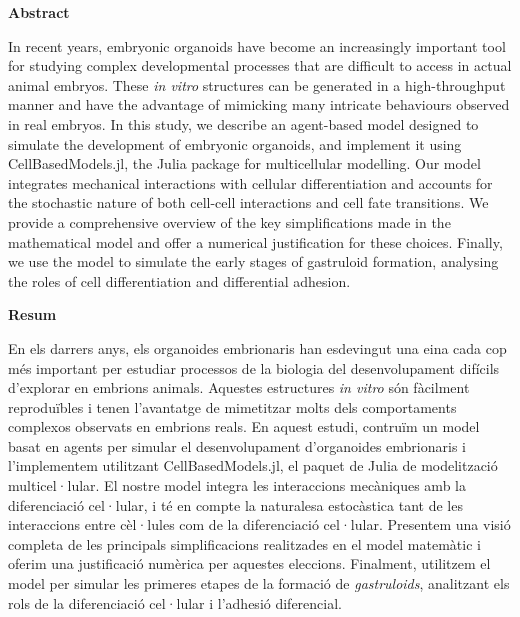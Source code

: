 \thispagestyle{plain}                                   %

\begin{center}
    {\Large\bfseries\sffamily  Abstract}
\end{center}

\vspace{0.5em}

In recent years, embryonic organoids have become an increasingly important tool for studying complex developmental processes that are difficult to access in actual animal embryos. These \textit{in vitro} structures can be generated in a high-throughput manner and have the advantage of mimicking many intricate behaviours observed in real embryos. In this study, we describe an agent-based model designed to simulate the development of embryonic organoids, and implement it using CellBasedModels.jl, the Julia package for multicellular modelling. Our model integrates mechanical interactions with cellular differentiation and accounts for the stochastic nature of both cell-cell interactions and cell fate transitions. We provide a comprehensive overview of the key simplifications made in the mathematical model and offer a numerical justification for these choices. Finally, we use the model to simulate the early stages of gastruloid formation, analysing the roles of cell differentiation and differential adhesion.

\vspace{2em}

\begin{center}
    {\Large\bfseries\sffamily Resum}
\end{center}

\vspace{0.5em}

En els darrers anys, els organoides embrionaris han esdevingut una eina cada cop més important per estudiar processos de la biologia del desenvolupament difícils d'explorar en embrions ani\-mals. Aquestes estructures \textit{in vitro} són fàcilment reproduïbles i te\-nen \linebreak l'avantatge de mimetitzar molts dels comportaments com\-plex\-os observats en embrions reals. En aquest estudi, contruïm un model basat en agents per simular el desenvolupament d'organoides embrionaris i l'im\-ple\-men\-tem uti\-litzant CellBasedModels.jl, el paquet de Julia de mo\-de\-lit\-zació multicel·lular. El nostre model integra les interaccions mecà\-niques amb la diferenciació cel·lular, i té en comp\-te la naturalesa estocàstica tant de les interaccions entre cèl·lules com de la diferenciació cel·lular. Presentem una visió completa de les principals simplificacions realitzades en el model mate\-mà\-tic i oferim una justificació numèrica per aquestes eleccions. Finalment, utilit\-zem el model per simular les primeres etapes de la formació de \textit{gastruloids}, analitzant els rols de la diferenciació ce\-l·lular i l'adhesió diferencial.

\restoregeometry